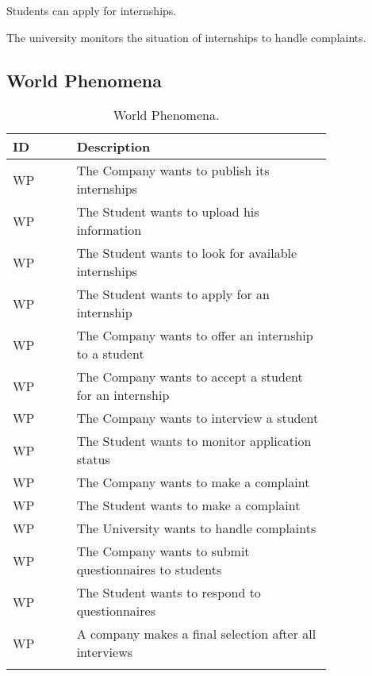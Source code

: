 Students can apply for internships.

The university monitors the situation of internships to handle complaints.

\newline
\newline

\subsection{World Phenomena}
\label{subsec:world_phenomena}%
\setcounter{wp}{1}
\newcommand{\cwp}{\thewp\stepcounter{wp}}
\begin{center}
    \begin{longtable}{ |l|p{0.8\linewidth}| }
        \hline
        \textbf{ID} & \textbf{Description}                                                \\
        \hline
        WP\cwp      & The Company wants to publish its internships\\
        \hline
        WP\cwp      & The Student wants to upload his information \\
        \hline
        WP\cwp      & The Student wants to look for available internships \\
        \hline
        WP\cwp      & The Student wants to apply for an internship \\
        \hline
        WP\cwp      & The Company wants to offer an internship to a student \\
        \hline
        WP\cwp      & The Company wants to accept a student for an internship \\
        \hline
        WP\cwp      & The Company wants to interview a student \\
        \hline
        WP\cwp      & The Student wants to monitor application status \\
        \hline
        WP\cwp      & The Company wants to make a complaint \\
        \hline
        WP\cwp      & The Student wants to make a complaint \\
        \hline
        WP\cwp      & The University wants to handle complaints \\
        \hline
        WP\cwp      & The Company wants to submit questionnaires to students \\
        \hline
        WP\cwp      & The Student wants to respond to questionnaires \\
        \hline
        WP\cwp      & A company makes a final selection after all interviews \\
        \hline
        \caption{World Phenomena.}
        \label{tab:worldph_tab}%
    \end{longtable}
\end{center}

